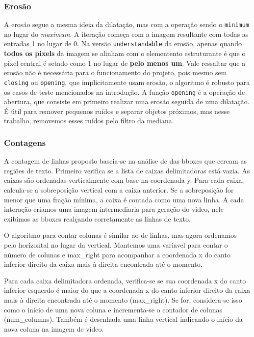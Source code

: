 \documentclass[english, 
               brazil, 
               bsc] %
               {dcomp-abntex2}
\begin{document}
\subsubsection{Erosão}

A erosão segue a mesma ideia da dilatação, mas com a operação sendo o \texttt{minimum} no lugar do \textit{maximum}. A iteração começa com a imagem resultante com todas as entradas 1 no lugar de 0. Na versão \texttt{understandable} da erosão, apenas quando \textbf{todos os pixels} da imagem se alinham com o elementento estruturante é que o pixel central é setado como 1 no lugar de \textbf{pelo menos um}. Vale ressaltar que a erosão não é necessária para o funcionamento do projeto, pois mesmo sem \texttt{closing} ou \texttt{opening}, que implicitamente usam erosão, o algoritmo é robusto para os casos de teste mencionados na introdução. A função \texttt{opening} é a operação de abertura, que consiste em primeiro realizar uma erosão seguida de uma dilatação. É útil para remover pequenos ruídos e separar objetos próximos, mas nesse trabalho, removemos esses ruídos pelo filtro da mediana.


\subsubsection{Contagens}
A contagem de linhas proposto baseia-se na análise de das bboxes que cercam as regiões de texto.
Primeiro verifica se a lista de caixas delimitadoras está vazia. As caixas são ordenadas verticalmente com base na coordenada y. Para cada caixa, calcula-se a sobreposição vertical com a caixa anterior. Se a sobreposição for menor que uma fração mínima, a caixa é contada como uma nova linha. A cada interação criamos uma imagem intermediaria para geração do video, nele exibimos as bboxes realçando corretamente as linhas de texto.

O algoritmo para contar colunas é similar ao de linhas, mas agora ordenamos pelo horizontal no lugar da vertical.
Mantemos uma variavel para contar o número de colunas e max\_right para acompanhar a coordenada x do canto inferior direito da caixa mais à direita encontrada até o momento.

Para cada caixa delimitadora ordenada, verifica-se se sua coordenada x do canto inferior esquerdo é maior do que a coordenada x do canto inferior direito da caixa mais à direita encontrada até o momento (max\_right). Se for, considera-se isso como o início de uma nova coluna e incrementa-se o contador de colunas (num\_columns). Também é desenhada uma linha vertical indicando o início da nova coluna na imagem de vídeo.
\end{document}

